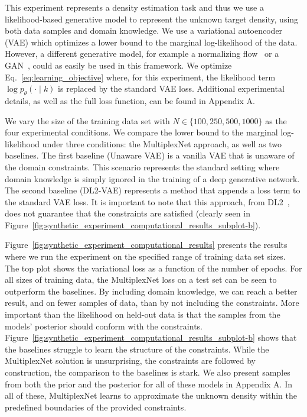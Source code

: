 \documentclass[letterpaper]{article} %
\begin{document}
This experiment represents a density estimation task and thus we use a likelihood-based generative model to represent the unknown target density, using both data samples and domain knowledge.
We use a variational autoencoder (VAE) which optimizes a lower bound to the marginal log-likelihood of the data. 
However, a different generative model, for example a normalizing flow~\citep{papamakarios2019normalizing} or a GAN~\citep{goodfellow2014generative}, could as easily be used in this framework.
We optimize Eq.~\ref{eq:learning_objective} where, for this experiment, the likelihood term $\log p_\theta ( \cdot \mid k)$ is replaced by the standard VAE loss.
Additional experimental details, as well as the full loss function, can be found in Appendix A.

We vary the size of the training data set with $N \in \{ 100, 250, 500, 1000 \}$ as the four experimental conditions.
We compare the lower bound to the marginal log-likelihood under three conditions: the MultiplexNet approach, as well as two baselines.
The first baseline (Unaware VAE) is a vanilla VAE that is unaware of the domain constraints. 
This scenario represents the standard setting where domain knowledge is simply ignored in the training of a deep generative network.
The second baseline (DL2-VAE) represents a method that appends a loss term to the standard VAE loss.
It is important to note that this approach, from DL2~\citep{fischer2018dl2}, does not guarantee that the constraints are satisfied (clearly seen in Figure~\ref{fig:synthetic_experiment_computational_results_subplot-b}).

Figure~\ref{fig:synthetic_experiment_computational_results} presents the results where we run the experiment on the specified range of training data set sizes.
The top plot shows the variational loss as a function of the number of epochs.
For all sizes of training data, the MultiplexNet loss on a test set can be seen to outperform the baselines. 
By including domain knowledge, we can reach a better result, and on fewer samples of data, than by not including the constraints. 
More important than the likelihood on held-out data is that the samples from the models' posterior should conform with the constraints.
Figure~\ref{fig:synthetic_experiment_computational_results_subplot-b} shows that the baselines struggle to learn the structure of the constraints.
While the MultiplexNet solution is unsurprising, the constraints are followed by construction, the comparison to the baselines is stark.
We also present samples from both the prior and the posterior for all of these models in Appendix A. 
In all of these, MultiplexNet learns to approximate the unknown density within the predefined boundaries of the provided constraints.
     
\end{document}

